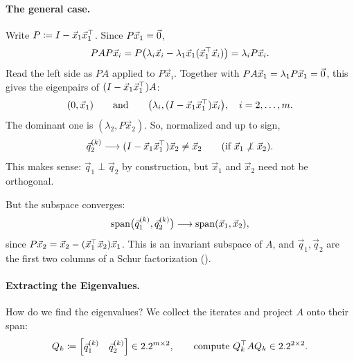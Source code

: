 \paragraph{The general case.} Write $P \coloneqq I - \vec{x}_1\vec{x}_1^\top$. Since $P\vec{x}_1 = \vec{0}$,
\begin{equation}
  PAP\vec{x}_i = P\bigl(\lambda_i\vec{x}_i - \lambda_1\vec{x}_1(\vec{x}_1^\top\vec{x}_i)\bigr) = \lambda_iP\vec{x}_i.
\end{equation}
Read the left side as $PA$ applied to $P\vec{x}_i$. Together with $PA\vec{x}_1 = \lambda_1P\vec{x}_1 = \vec{0}$, this gives the eigenpairs of $(I - \vec{x}_1\vec{x}_1^\top)A$:
\begin{equation}
  (0, \vec{x}_1) \qquad\text{and}\qquad \bigl(\lambda_i, (I - \vec{x}_1\vec{x}_1^\top)\vec{x}_i\bigr), \quad i = 2, \dots, m.
\end{equation}
The dominant one is $(\lambda_2, P\vec{x}_2)$. So, normalized and up to sign,
\begin{equation}
  \vec{q}_2^{(k)} \longrightarrow (I - \vec{x}_1\vec{x}_1^\top)\vec{x}_2 \ne \vec{x}_2 \qquad (\text{if } \vec{x}_1 \not\perp \vec{x}_2).
\end{equation}
This makes sense: $\vec{q}_1 \perp \vec{q}_2$ by construction, but $\vec{x}_1$ and $\vec{x}_2$ need not be orthogonal.

But the subspace converges:
\begin{equation}
  \operatorname{span}\bigl(\vec{q}_1^{(k)}, \vec{q}_2^{(k)}\bigr) \longrightarrow \operatorname{span}(\vec{x}_1, \vec{x}_2),
\end{equation}
since $P\vec{x}_2 = \vec{x}_2 - (\vec{x}_1^\top\vec{x}_2)\vec{x}_1$. This is an invariant subspace of $A$, and $\vec{q}_1, \vec{q}_2$ are the first two columns of a Schur factorization ().

\paragraph{Extracting the Eigenvalues.}

How do we find the eigenvalues? We collect the iterates and project $A$ onto their span:
\begin{equation}
  Q_k \coloneqq \begin{bmatrix} \vec{q}_1^{(k)} & \vec{q}_2^{(k)} \end{bmatrix} \in 2.2^{m \times 2}, \qquad \text{compute } Q_k^\top AQ_k \in 2.2^{2 \times 2}.
\end{equation}

